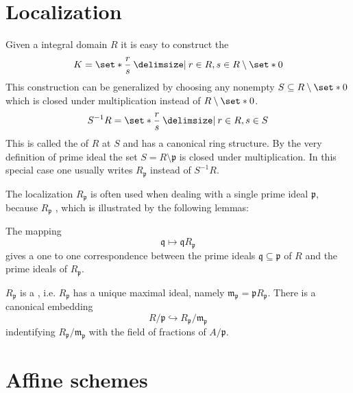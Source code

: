 \section{Localization}
\label{sec:localization}
Given a integral domain $R$ it is easy to construct the 
\[
	K = \set*{\frac{r}{s} \given r \in R, s \in R \setminus \set*{0}}
\]
This construction can be generalized by choosing any nonempty $S \subseteq R \setminus \set*{0}$ which is closed under multiplication instead of $R \setminus \set*{0}$.
\[
	S^{-1}R = \set*{\frac{r}{s} \given r \in R, s \in S}
\]
This is called the  of $R$ at $S$ and has a canonical ring structure.
By the very definition of prime ideal the set $S=R \setminus \mathfrak{p}$ is closed under multiplication.
In this special case one usually writes $R_{\mathfrak{p}}$ instead of $S^{-1}R$.

The localization $R_{\mathfrak{p}}$ is often used when dealing with a single prime ideal $\mathfrak{p}$, because $R_{\mathfrak{p}}$ , which is illustrated by the following lemmas:

\begin{lemma}
	The mapping
	\[
		\mathfrak{q} \longmapsto \mathfrak{q}R_{\mathfrak{p}}
	\]
	gives a one to one correspondence between the prime ideals $\mathfrak{q} \subseteq \mathfrak{p}$ of $R$ and the prime ideals of $R_{\mathfrak{p}}$.
\end{lemma}

\begin{lemma}
	$R_{\mathfrak{p}}$ is a , i.e. $R_{\mathfrak{p}}$ has a unique maximal ideal, namely $\mathfrak{m}_{\mathfrak{p}} = \mathfrak{p} R_{\mathfrak{p}}$.
	There is a canonical embedding
	\[
		R/\mathfrak{p} \hookrightarrow R_{\mathfrak{p}}/\mathfrak{m}_{\mathfrak{p}}
	\]
	indentifying $R_{\mathfrak{p}}/\mathfrak{m}_{\mathfrak{p}}$ with the field of fractions of $A/\mathfrak{p}$.
\end{lemma}





\section{Affine schemes}
\label{sec:affine schemes}

